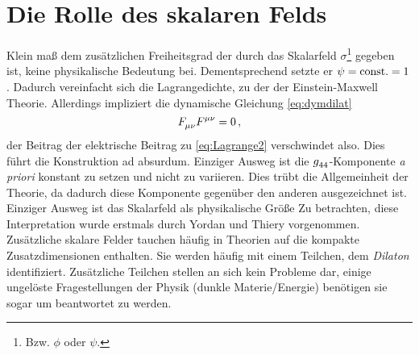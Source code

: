 \section{Die Rolle des skalaren Felds}
  Klein maß dem zusätzlichen Freiheitsgrad der durch das Skalarfeld
  $\sigma$\footnote{Bzw. $\phi$ oder $\psi$.} gegeben ist, keine physikalische
  Bedeutung bei.
  Dementsprechend setzte er $\psi=\mathrm{const.}=1$ .
 Dadurch vereinfacht sich die Lagrangedichte, zu der der Einstein-Maxwell
 Theorie.
 Allerdings impliziert die dynamische Gleichung
 \eqref{eq:dymdilat}
  \begin{equation}
\tensor*{F}{_\mu_\nu}\tensor*{F}{^\mu^\nu}=0\,,
 \end{equation}
 der Beitrag der elektrische Beitrag zu \eqref{eq:Lagrange2} verschwindet also.
 Dies führt die Konstruktion ad absurdum. Einziger Ausweg ist die $\tensor{g}{_4_4}$-Komponente
\emph{a priori} konstant zu setzen und nicht zu variieren. Dies trübt
die Allgemeinheit der Theorie, da dadurch diese Komponente gegenüber den anderen
ausgezeichnet ist.
Einziger Ausweg ist das Skalarfeld als physikalische Größe Zu betrachten, diese 
Interpretation wurde erstmals durch Yordan und Thiery vorgenommen.
Zusätzliche skalare Felder tauchen häufig in Theorien auf die kompakte
Zusatzdimensionen enthalten.
Sie werden häufig mit einem Teilchen, dem \emph{Dilaton} identifiziert. Zusätzliche Teilchen stellen an sich kein
Probleme dar, einige ungelöste Fragestellungen der Physik (dunkle
Materie/Energie) benötigen sie sogar um beantwortet zu werden. 
